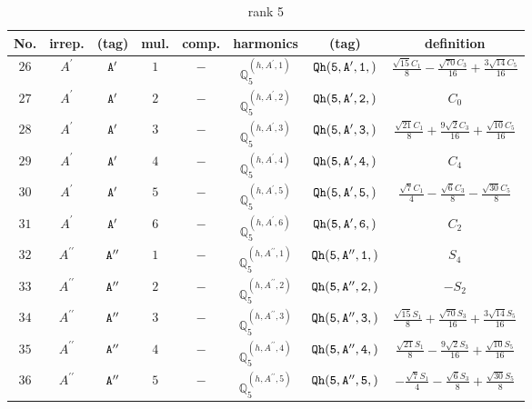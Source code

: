 \documentclass[fleqn,8pt]{jsarticle}
\begin{document}
\begin{table}[ht!]
\begin{center}
\caption{rank 5}
\renewcommand{\arraystretch}{1.3}
\begin{tabular}{cccccccc} \hline \hline
No. & irrep. & (tag) & mul. & comp. & harmonics & (tag) & definition \\ \hline
$ 26 $ & $ A^{\prime} $ & $ {\tt A'} $ & $ 1 $ & $ - $ & $ \mathbb{Q}_{5}^{(h,A^{\prime},1)} $ & $ {\tt Qh(5,A',1,)} $ & $ \frac{\sqrt{15} C_{1}}{8} - \frac{\sqrt{70} C_{3}}{16} + \frac{3 \sqrt{14} C_{5}}{16} $ \\
$ 27 $ & $ A^{\prime} $ & $ {\tt A'} $ & $ 2 $ & $ - $ & $ \mathbb{Q}_{5}^{(h,A^{\prime},2)} $ & $ {\tt Qh(5,A',2,)} $ & $ C_{0} $ \\
$ 28 $ & $ A^{\prime} $ & $ {\tt A'} $ & $ 3 $ & $ - $ & $ \mathbb{Q}_{5}^{(h,A^{\prime},3)} $ & $ {\tt Qh(5,A',3,)} $ & $ \frac{\sqrt{21} C_{1}}{8} + \frac{9 \sqrt{2} C_{3}}{16} + \frac{\sqrt{10} C_{5}}{16} $ \\
$ 29 $ & $ A^{\prime} $ & $ {\tt A'} $ & $ 4 $ & $ - $ & $ \mathbb{Q}_{5}^{(h,A^{\prime},4)} $ & $ {\tt Qh(5,A',4,)} $ & $ C_{4} $ \\
$ 30 $ & $ A^{\prime} $ & $ {\tt A'} $ & $ 5 $ & $ - $ & $ \mathbb{Q}_{5}^{(h,A^{\prime},5)} $ & $ {\tt Qh(5,A',5,)} $ & $ \frac{\sqrt{7} C_{1}}{4} - \frac{\sqrt{6} C_{3}}{8} - \frac{\sqrt{30} C_{5}}{8} $ \\
$ 31 $ & $ A^{\prime} $ & $ {\tt A'} $ & $ 6 $ & $ - $ & $ \mathbb{Q}_{5}^{(h,A^{\prime},6)} $ & $ {\tt Qh(5,A',6,)} $ & $ C_{2} $ \\
$ 32 $ & $ A^{\prime\prime} $ & $ {\tt A''} $ & $ 1 $ & $ - $ & $ \mathbb{Q}_{5}^{(h,A^{\prime\prime},1)} $ & $ {\tt Qh(5,A'',1,)} $ & $ S_{4} $ \\
$ 33 $ & $ A^{\prime\prime} $ & $ {\tt A''} $ & $ 2 $ & $ - $ & $ \mathbb{Q}_{5}^{(h,A^{\prime\prime},2)} $ & $ {\tt Qh(5,A'',2,)} $ & $ - S_{2} $ \\
$ 34 $ & $ A^{\prime\prime} $ & $ {\tt A''} $ & $ 3 $ & $ - $ & $ \mathbb{Q}_{5}^{(h,A^{\prime\prime},3)} $ & $ {\tt Qh(5,A'',3,)} $ & $ \frac{\sqrt{15} S_{1}}{8} + \frac{\sqrt{70} S_{3}}{16} + \frac{3 \sqrt{14} S_{5}}{16} $ \\
$ 35 $ & $ A^{\prime\prime} $ & $ {\tt A''} $ & $ 4 $ & $ - $ & $ \mathbb{Q}_{5}^{(h,A^{\prime\prime},4)} $ & $ {\tt Qh(5,A'',4,)} $ & $ \frac{\sqrt{21} S_{1}}{8} - \frac{9 \sqrt{2} S_{3}}{16} + \frac{\sqrt{10} S_{5}}{16} $ \\
$ 36 $ & $ A^{\prime\prime} $ & $ {\tt A''} $ & $ 5 $ & $ - $ & $ \mathbb{Q}_{5}^{(h,A^{\prime\prime},5)} $ & $ {\tt Qh(5,A'',5,)} $ & $ - \frac{\sqrt{7} S_{1}}{4} - \frac{\sqrt{6} S_{3}}{8} + \frac{\sqrt{30} S_{5}}{8} $ \\
 \hline \hline
\end{tabular}
\end{center}
\end{table}
\end{document}
